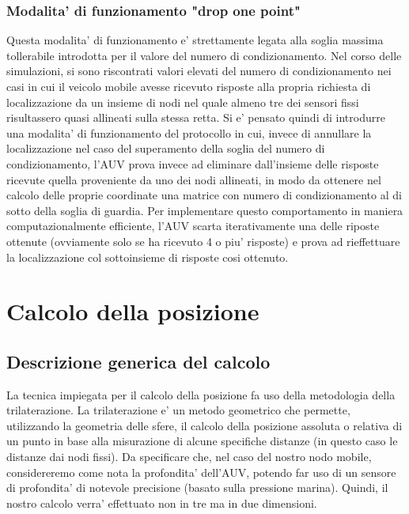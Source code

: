 \documentclass[Lau,binding=0.6cm]{sapthesis}
\begin{document}
\subsubsection{Modalita' di funzionamento "drop one point"}
\par
Questa modalita' di funzionamento e' strettamente legata alla soglia massima tollerabile introdotta per il valore del numero di condizionamento. Nel corso delle simulazioni, si sono riscontrati valori elevati del numero di condizionamento nei casi in cui il veicolo mobile avesse ricevuto risposte alla propria richiesta di localizzazione da un insieme di nodi nel quale almeno tre dei sensori fissi risultassero quasi allineati sulla stessa retta. Si e' pensato quindi di introdurre una modalita' di funzionamento del protocollo in cui, invece di annullare la localizzazione nel caso del superamento della soglia del numero di condizionamento, l'AUV prova invece ad eliminare dall'insieme delle risposte ricevute quella proveniente da uno dei nodi allineati, in modo da ottenere nel calcolo delle proprie coordinate una matrice con numero di condizionamento al di sotto della soglia di guardia. Per implementare questo comportamento in maniera computazionalmente efficiente, l'AUV scarta iterativamente una delle riposte ottenute (ovviamente solo se ha ricevuto 4 o piu' risposte) e prova ad rieffettuare la localizzazione col sottoinsieme di risposte cosi ottenuto.
\par


\section{Calcolo della posizione}

\subsection{Descrizione generica del calcolo}
La tecnica impiegata per il calcolo della posizione fa uso della metodologia della trilaterazione. La trilaterazione e' un metodo geometrico che permette, utilizzando la geometria delle sfere, il calcolo della posizione assoluta o relativa di un punto in base alla misurazione di alcune specifiche distanze (in questo caso le distanze dai nodi fissi).\newline
Da specificare che, nel caso del nostro nodo mobile, considereremo come nota la profondita' dell'AUV, potendo far uso di un sensore di profondita' di notevole precisione (basato sulla pressione marina).
Quindi, il nostro calcolo verra' effettuato non in tre ma in due dimensioni. 
\end{document}
